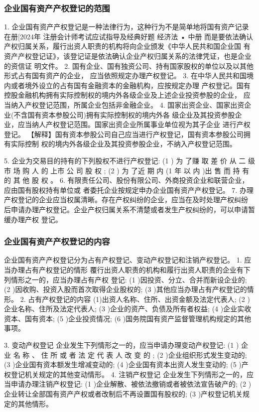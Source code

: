 \documentclass[UTF8,12pt]{ctexart}
\numberwithin{equation}{section} %
\numberwithin{figure}{section}
\numberwithin{table}{section}
\begin{document}
	\subsubsection{企业国有资产产权登记的范围}
	
	1. 企业国有资产产权登记是一种法律行为，这种行为不是简单地将国有资产记录在册[2024年 注册会计师考试应试指导及经典好题 经济法 • 中册
	而是要依法确认产权归属关系，履行出资人职责的机构将向企业颁发《中华人民共和国企业国
	有资产产权登记证》，该登记证是依法确认企业产权归属关系的法律凭证，也是企业的资信证
	明文件。
	2. 国有企业、国有独资公司、持有国家股权的单位以及以其他形式占有国有资产的企业，
	应当依照规定办理产权登记。
	3. 在中华人民共和国境内或者境外设立的占有国有金融资本的金融机构，应按规定办理
	产权登记。国有控股金融机构拥有实际控制权的境内外各级企业及上述企业投资参股的企业，
	应当纳入产权登记范围，所属企业包括非金融企业。
	4. 国家出资企业、国家出资企业(不含国有资本参股公司)拥有实际控制权的境内外各
	级企业及其投资参股企业，应当纳人产权登记范围。国家出资企业所属事业单位视为其子企业
	进行产权登记。
	【解释】国有资本参股公司自己应当进行产权登记，国有资本参股公司拥有实际控制
	权的境内外各级企业及其投资参股企业，不纳入产权登记范围。
	
	5. 企业为交易目的持有的下列股权不进行产权登记:
	(1 ) 为 了赚 取 差 价 从 二 级 市 场 购 人 的 上市 公 司 股 权 ;
	(2 ) 为 了近 期 内 (1 年 以 内 )出 售 而 持 有 的 其 他 股 权 。
	6. 有限责任公司、股份有限公司、外商投资企业和联营企业，应由国有股权持有单位或
	者委托企业按规定申办企业国有资产产权登记。
	7. 办理产权登记的企业应当权属清晰。存在产权纠纷的企业，应当在及时处理产权纠纷
	后申请办理产权登记。企业产权归属关系不清楚或者发生产权纠纷的，可以申请暂缓办理产权
	登记。
	
	\subsubsection{企业国有资产产权登记的内容}
	
	企业国有资产产权登记分为占有产权登记、变动产权登记和注销产权登记。
	1. 应当办理占有产权登记的情形
	覆行出资人职责的机构和履行出资人职责的企业有下列情形之一的，应当办理占有产权
	登记:
	(1 )因投资、分立、合并而新设企业的;
	(2 )因收购、投资入股而首次取得企业股权的;
	(3 )其他应当办理占有产权登记的情形。
	2. 占有产权登记的内容
	(1)出资人名称、住所、出资金额及法定代表人;
	(2 )企业名称、住所及法定代表人;
	(3 )企业的资产、负债及所有者权益;
	(4 )企业实收资本、国有资本;
	(5 )企业投资情况;
	(6 )国务院国有资产监督管理机构规定的其他事项。
	
	3. 变动产权登记
	企业发生下列情形之一的，应当申请办理变动产权登记:
	(1 ) 企 业 名 称 、 住 所 或 者 法 定 代 表 人 改 变 的 ;
	(2 )企业组织形式发生变动的;
	(3 )企业国有资本额发生增减变动的;
	(4 )企业国有资本出资人发生变动的;
	(5 )产权登记机关规定的其他变动情形。
	4. 注销产权登记
	企业发生下列情形之一的，应当申请办理注销产权登记:
	(1 )企业解散、被依法撤销或者被依法宣告破产的;
	(2 )企业转让全部国有资产产权或者改制后不再设置国有股权的;
	(3 )产权登记机关规定的其他情形。
	
\end{document}
